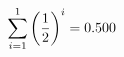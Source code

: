 \documentclass[preview]{standalone}
\begin{document}
\begin{align*}
\sum_{i=1}^{ 1 } \left({ 1 } \over {2} \right)^i = { 0.500 }
\end{align*}
\end{document}
